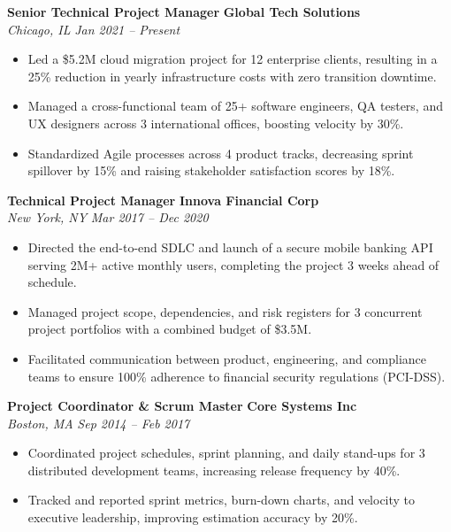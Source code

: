 \documentclass[10pt,letterpaper]{article}
\begin{document}
\noindent \textbf{Senior Technical Project Manager} \hfill \textbf{\color{primary} Global Tech Solutions} \\
\textit{Chicago, IL} \hfill \textit{Jan 2021 -- Present}
\begin{itemize}
  \item Led a \$5.2M cloud migration project for 12 enterprise clients, resulting in a 25\% reduction in yearly infrastructure costs with zero transition downtime.
  \item Managed a cross-functional team of 25+ software engineers, QA testers, and UX designers across 3 international offices, boosting velocity by 30\%.
  \item Standardized Agile processes across 4 product tracks, decreasing sprint spillover by 15\% and raising stakeholder satisfaction scores by 18\%.
\end{itemize}

\vspace{5pt}

\noindent \textbf{Technical Project Manager} \hfill \textbf{\color{primary} Innova Financial Corp} \\
\textit{New York, NY} \hfill \textit{Mar 2017 -- Dec 2020}
\begin{itemize}
  \item Directed the end-to-end SDLC and launch of a secure mobile banking API serving 2M+ active monthly users, completing the project 3 weeks ahead of schedule.
  \item Managed project scope, dependencies, and risk registers for 3 concurrent project portfolios with a combined budget of \$3.5M.
  \item Facilitated communication between product, engineering, and compliance teams to ensure 100\% adherence to financial security regulations (PCI-DSS).
\end{itemize}

\vspace{5pt}

\noindent \textbf{Project Coordinator \& Scrum Master} \hfill \textbf{\color{primary} Core Systems Inc} \\
\textit{Boston, MA} \hfill \textit{Sep 2014 -- Feb 2017}
\begin{itemize}
  \item Coordinated project schedules, sprint planning, and daily stand-ups for 3 distributed development teams, increasing release frequency by 40\%.
  \item Tracked and reported sprint metrics, burn-down charts, and velocity to executive leadership, improving estimation accuracy by 20\%.
\end{itemize}
\end{document}
